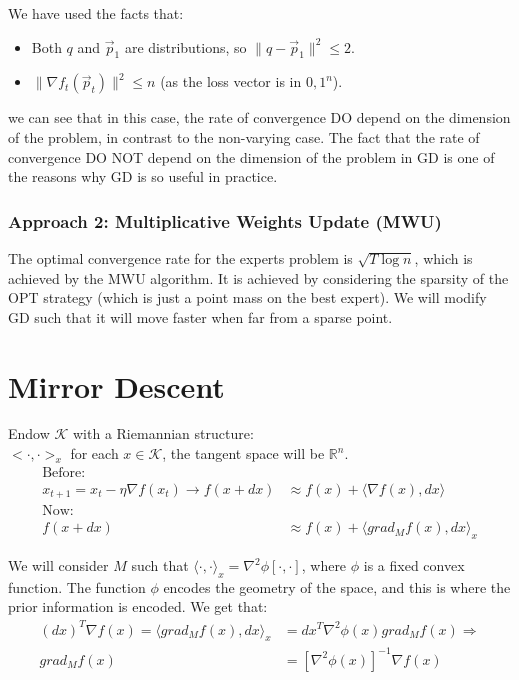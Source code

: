 \documentclass[11pt]{book} %
\begin{document}
We have used the facts that: 
\begin{itemize}
    \item Both $q$ and $\vec{p}_1$ are distributions, so $\| q - \vec{p}_1 \|^2 \leq 2$.
    \item $\| \nabla f_t(\vec{p}_t) \|^2 \leq n$ (as the loss vector is in ${0,1}^n$).
\end{itemize}

we can see that in this case, the rate of convergence DO depend on the dimension of the problem, in contrast to the non-varying case.
The fact that the rate of convergence DO NOT depend on the dimension of the problem in GD is one of the reasons why GD is so useful in practice.


\subsubsection{Approach 2: Multiplicative Weights Update (MWU)}

The optimal convergence rate for the experts problem is $\sqrt{T \log n}$, which is achieved by the MWU algorithm.
It is achieved by considering the sparsity of the OPT strategy (which is just a point mass on the best expert). 
We will modify GD such that it will move faster when far from a sparse point.

\medbreak



\section{Mirror Descent}

Endow $\mathcal{K}$ with a Riemannian structure: \\
$<\cdot, \cdot>_x$ for each $x \in \mathcal{K}$, the tangent space will be $\mathbb{R}^n$. \\
\begin{align*}
    \text{Before:}\\
    x_{t+1} = x_t - \eta \nabla f(x_t) \rightarrow f(x + dx) &\approx f(x) + \langle \nabla f(x) , dx \rangle \\
    \text{Now:}\\
   f(x + dx) &\approx f(x) + \langle grad_M f(x) , dx \rangle_x
\end{align*}

We will consider $M$ such that $\langle \cdot, \cdot \rangle_x = \nabla^2 \phi [\cdot, \cdot]$, where $\phi$ is a fixed convex function. 
The function $\phi$ encodes the geometry of the space, and this is where the prior information is encoded. We get that:
\begin{align*}
    (dx)^T  \nabla f(x) = \langle grad_M f(x) , dx \rangle_x &= dx^T \nabla^2 \phi(x) grad_M f(x) \Rightarrow \\
    grad_M f(x) &= [\nabla^2 \phi(x)]^{-1} \nabla f(x)
\end{align*}
\end{document}
